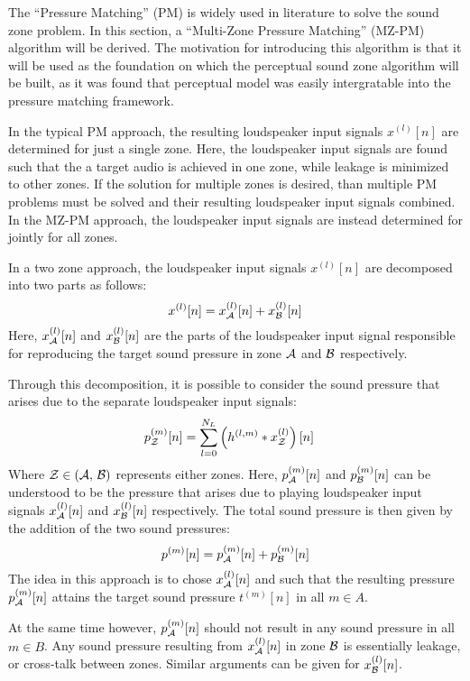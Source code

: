 The ``Pressure Matching'' (PM) is widely used in literature to solve the sound zone problem.
In this section, a ``Multi-Zone Pressure Matching'' (MZ-PM) algorithm will be derived.
The motivation for introducing this algorithm is that it will be used as the foundation on which the perceptual sound zone algorithm will be built, 
as it was found that perceptual model was easily intergratable into the pressure matching framework.

In the typical PM approach, the resulting loudspeaker input signals $x^{(l)}[n]$ are determined for just a single zone.
Here, the loudspeaker input signals are found such that the a target audio is achieved in one zone, while leakage is minimized to other zones.
If the solution for multiple zones is desired, than multiple PM problems must be solved and their resulting loudspeaker input signals combined. 
In the MZ-PM approach, the loudspeaker input signals are instead determined for jointly for all zones.

In a two zone approach, the loudspeaker input signals $x^{(l)}[n]$ are decomposed into two parts as follows:
\begin{equation}
    x^{(l)}[n] = x_{\mathcal{A}}^{(l)}[n] + x_{\mathcal{B}}^{(l)}[n]
\end{equation}
Here, $x_{\mathcal{A}}^{(l)}[n]$ and $x_{\mathcal{B}}^{(l)}[n]$ are the parts of the loudspeaker input signal responsible for reproducing the target sound pressure 
in zone $\mathcal{A}$ and $\mathcal{B}$ respectively.

Through this decomposition, it is possible to consider the sound pressure that arises due to the separate loudspeaker input signals:
\begin{align}
    p_{\mathcal{Z}}^{(m)}[n] &= \sum_{l=0}^{N_L} \left(h^{(l,m)} \ast x_{\mathcal{Z}}^{(l)}\right)[n] 
\end{align}
Where $\mathcal{Z} \in \left(\mathcal{A},\,\mathcal{B}\right)$ represents either zones.
Here, $p_{\mathcal{A}}^{(m)}[n]$ and $p_{\mathcal{B}}^{(m)}[n]$ can be understood to be the pressure that arises due to 
playing loudspeaker input signals $x_{\mathcal{A}}^{(l)}[n]$ and $x_{\mathcal{B}}^{(l)}[n]$ respectively. 
The total sound pressure is then given by the addition of the two sound pressures:
\begin{equation}
    p^{(m)}[n] = p_{\mathcal{A}}^{(m)}[n] + p_{\mathcal{B}}^{(m)}[n]
\end{equation}
The idea in this approach is to chose $x_{\mathcal{A}}^{(l)}[n]$ and such that the resulting pressure $p_{\mathcal{A}}^{(m)}[n]$ attains the target sound pressure $t^{(m)}[n]$ in all $m \in A$.   

At the same time however, $p_{\mathcal{A}}^{(m)}[n]$ should not result in any sound pressure in all $m \in B$.
Any sound pressure resulting from $x_{\mathcal{A}}^{(l)}[n]$ in zone $\mathcal{B}$ is essentially leakage, or cross-talk between zones. 
Similar arguments can be given for $x_{\mathcal{B}}^{(l)}[n]$.

